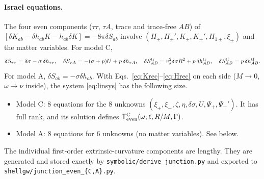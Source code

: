 \documentclass[11pt,a4paper]{article}
\numberwithin{equation}{section}
\begin{document}
\paragraph{Israel equations.} The four even components ($\tau\tau$, $\tau A$, trace and trace-free $AB$) of
$[\delta K_{ab}-\delta h_{ab}K-h_{ab}\delta K]=-8\pi\delta S_{ab}$ involve
$(H_\pm,H_\pm',K_\pm,K_\pm',H_{1\pm},\xi_\pm)$ and the matter variables. For model C,
\begin{equation}
\delta S_{\tau\tau}=\delta\sigma-\sigma\,\delta h_{\tau\tau},\quad
\delta S_{\tau A}=-(\sigma+p)U+p\,\delta h_{\tau A},\quad
\delta S^{\rm tr}_{AB}=v_s^2\delta\sigma R^2+p\,\delta h^{\rm tr}_{AB},\quad
\delta S^{\rm tf}_{AB}=p\,\delta h^{\rm tf}_{AB}.
\label{eq:dSeven}
\end{equation}
For model A, $\delta S_{ab}=-\sigma\delta h_{ab}$. With Eqs.~\eqref{eq:Krec}--\eqref{eq:Hrec} on each side
($M\to0$, $\omega\to\nu$ inside), the system \eqref{eq:linsys} has the following size.
\begin{itemize}
\item Model C: 8 equations for the 8 unknowns $(\xi_+,\xi_-,\zeta,\eta,\delta\sigma,U,\Psi_+,\Psi_+')$. It has
full rank, and its solution defines $\mathsf T_{\rm even}^{\rm C}(\omega;\ell,R/M,\Gamma)$.
\item Model A: 8 equations for 6 unknowns (no matter variables). See below.
\end{itemize}
The individual first-order extrinsic-curvature components are lengthy. They are generated and stored
exactly by \texttt{symbolic/derive\_junction.py} and exported to \texttt{shellgw/junction\_even\_\{C,A\}.py}.
\end{document}
